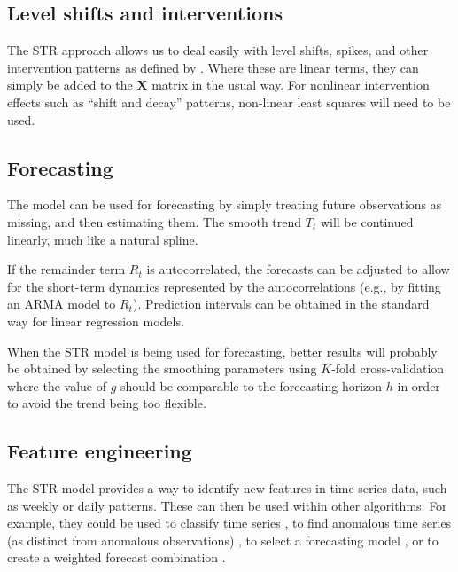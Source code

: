 \documentclass[11pt,a4paper,]{article}
\begin{document}
\hypertarget{level-shifts-and-interventions}{%
\subsection{Level shifts and interventions}\label{level-shifts-and-interventions}}

The STR approach allows us to deal easily with level shifts, spikes, and other intervention patterns as defined by \textcite{BoxTiao1975}. Where these are linear terms, they can simply be added to the \(\bm{X}\) matrix in the usual way. For nonlinear intervention effects such as ``shift and decay'' patterns, non-linear least squares will need to be used.

\hypertarget{forecasting}{%
\subsection{Forecasting}\label{forecasting}}

The model can be used for forecasting by simply treating future observations as missing, and then estimating them. The smooth trend \(T_t\) will be continued linearly, much like a natural spline.

If the remainder term \(R_t\) is autocorrelated, the forecasts can be adjusted to allow for the short-term dynamics represented by the autocorrelations (e.g., by fitting an ARMA model to \(R_t\)). Prediction intervals can be obtained in the standard way for linear regression models.

When the STR model is being used for forecasting, better results will probably be obtained by selecting the smoothing parameters using \(K\)-fold cross-validation where the value of \(g\) should be comparable to the forecasting horizon \(h\) in order to avoid the trend being too flexible.

\hypertarget{feature-engineering}{%
\subsection{Feature engineering}\label{feature-engineering}}

The STR model provides a way to identify new features in time series data, such as weekly or daily patterns. These can then be used within other algorithms. For example, they could be used to classify time series \autocite{catch22}, to find anomalous time series (as distinct from anomalous observations) \autocite{cikm2015}, to select a forecasting model \autocite{fforms}, or to create a weighted forecast combination \autocite{fforma}.
\end{document}
